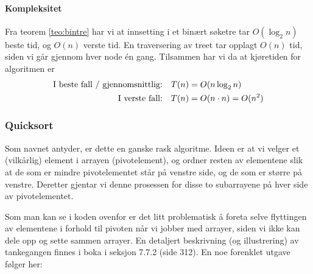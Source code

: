 \paragraph{Kompleksitet}
Fra teorem \ref{teo:bintre} har vi at innsetting i et binært søketre tar $ O(\log_2 n) $ beste tid, og $ O(n) $ verste tid. En traversering av treet tar opplagt $ O(n) $ tid, siden vi går gjennom hver node én gang. Tilsammen har vi da at kjøretiden for algoritmen er 
\begin{align*}
\text{I beste fall / gjennomsnittlig:\quad} & T(n) = O(n\log_2 n)\\
\text{I verste fall:\quad} & T(n) = O(n\cdot n) = O(n^2)
\end{align*}


\subsubsection{Quicksort}
\label{quick}
Som navnet antyder, er dette en ganske rask algoritme.
Ideen er at vi velger et (vilkårlig) element i arrayen (pivotelement), og ordner resten av
elementene slik at de som er mindre pivotelementet står på venstre side, og de
som er større på venstre. Deretter gjentar vi denne prosessen for disse to
subarrayene på hver side av pivotelementet.


Som man kan se i koden ovenfor er det litt problematisk å foreta selve
flyttingen av elementene i forhold til pivoten når vi jobber med arrayer, siden
vi ikke kan dele opp og sette sammen arrayer. En detaljert beskrivning (og
illustrering) av tankegangen finnes i boka i seksjon 7.7.2 (side 312). 
En noe forenklet utgave følger her:

